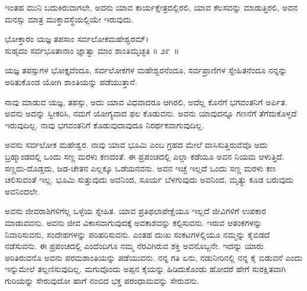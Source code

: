 ಇಂತಹ ಮುನಿ ಬದುಕಿರುವಾಗಲೇ, ಅವನು ಯಾವ ಕಾರ್ಯಕ್ಷೇತ್ರದಲ್ಲಿರಲಿ, ಯಾವ ಕೆಲಸವನ್ನು ಮಾಡುತ್ತಿರಲಿ, ಅವನ ಮನಸ್ಸು ಮಾತ್ರ ಮುಕ್ತಾವಸ್ಥೆಯಲ್ಲಿಯೇ ಇರುವುದು.

\begin{shloka}
ಭೋಕ್ತಾರಂ ಯಜ್ಞ ತಪಸಾಂ ಸರ್ವಲೋಕಮಹೇಶ್ವರಮ್​।\\ಸುಹೃದಂ ಸರ್ವಭೂತಾನಾಂ ಜ್ಞಾತ್ವಾ ಮಾಂ ಶಾಂತಿಮೃಚ್ಛತಿ \hfill॥ ೨೯~॥
\end{shloka}

\begin{artha}
ಯಜ್ಞ ತಪಸ್ಸುಗಳ ಭೋಕ್ತೃವೆಂದೂ, ಸರ್ವಲೋಕಗಳ ಮಹೇಶ್ವರನೆಂದೂ, ಸರ್ವಪ್ರಾಣಿಗಳ ಸ್ನೇಹಿತ\-ನೆಂದೂ ನನ್ನನ್ನು ಅರಿತುಕೊಂಡ ಯೋಗಿ ಶಾಂತಿಯನ್ನು ಪಡೆಯುತ್ತಾನೆ.
\end{artha}

ನಾವು ಮಾಡುವ ಯಜ್ಞ, ತಪಸ್ಸು, ಅದು ಯಾವ ವಿಧವಾದರೂ ಆಗಿರಲಿ, ಅದೆಲ್ಲ ಕೊನೆಗೆ ಭಗವಂತನಿಗೆ ಅರ್ಪಿತ. ಅವನು ಅದನ್ನು ಸ್ವೀಕರಿಸಿ, ನಮಗೆ ಯೋಗ್ಯವಾದ ಫಲ ಕೊಡುವನು. ಅವನು ಯಾವುದನ್ನೂ ಗಣನೆಗೆ ತೆಗೆದುಕೊಳ್ಳದೆ ಇರುವುದಿಲ್ಲ. ನಾವು ಭಗವಂತನಿಗೆ ಕೊಡುವುದಾವುದೂ ನಿರರ್ಥಕವಾಗುವುದಿಲ್ಲ. 

ಅವನು ಸರ್ವಲೋಕ ಮಹೇಶ್ವರ. ನಾವು ಯಾವ ಭೂಮಿ ಎಂಬ ಗ್ರಹದ ಮೇಲೆ ವಾಸಿಸುತ್ತಿರುವೆವೊ ಅದು ಬ್ರಹ್ಮಾಂಡದಲ್ಲಿ ಒಂದು ಸಣ್ಣ ಮರಳು ಕಣದಂತೆ. ಈ ಪ್ರಪಂಚದಲ್ಲಿ ಎಲ್ಲಾ ಕಡೆಯೂ ಅವನ ನಿಯಮ ಆಳುತ್ತಿದೆ. ಸಣ್ಣದು-ದೊಡ್ಡದು, ಜಡ-ಚೇತನ ಎಲ್ಲಕ್ಕೂ ಒಡೆಯನವನು. ಅವನ ಇಚ್ಛೆ ಇಲ್ಲದೆ ಒಂದು ಸಣ್ಣ ಮರಳು ಕಣ ಚಲಿಸುವಂತೆ ಇಲ್ಲ. ಭೂಮಿ ಸುತ್ತುವುದು ಅವನಿಂದ, ಸೂರ್ಯ ಬೆಳಗುವುದು ಅವನಿಂದ, ಮೃತ್ಯು ಕೂಡ ಬರುವುದು ಅವನಿಂದಲೇ.

ಅವನು ಜೀವರಾಶಿಗಳಿಗೆಲ್ಲ ಒಳ್ಳೆಯ ಸ್ನೇಹಿತ. ಯಾವ ಪ್ರತಿಫಲಾಪೇಕ್ಷೆಯೂ ಇಲ್ಲದೆ ಜೀವಿಗಳಿಗೆ ಉಪಕಾರ ಮಾಡುವವನು. ಅವನು ಜೀವ ವಿಕಾಸವಾಗುವುದಕ್ಕೆ ಅವಕಾಶವನ್ನು ಕಲ್ಪಿಸುವನು. ಇರುವ ಆತಂಕಗಳನ್ನು ನಿವಾರಿಸುವನು, ಸಂದೇಹಗಳನ್ನು ಪರಿಹರಿಸುವನು. ಎಂತಹ ದುಃಖ ಸಂಕಟಗಳಲ್ಲಿಯೂ ನಮ್ಮನ್ನು ಕೈಬಿಡದೆ ನಡೆಸುವನು. ಈ ಪ್ರಪಂಚದಲ್ಲಿ ಎಂದೆಂದಿಗೂ ನಮ್ಮ ನೆರವಿಗಿರುವ ಶಕ್ತಿ ಅವನೊಬ್ಬನೇ. ಇದನ್ನು ಯಾರು ಅರಿತಿರುವನೊ ಅವನು ಪರಮಶಾಂತಿಯನ್ನು ಪಡೆಯುವನು. ನನ್ನ ಗತಿ ಏನು, ನಡುನೀರಿನಲ್ಲಿ ನನ್ನ ಕೈ ಬಿಡುವನೆ ಎಂದು ಇನ್ನುಮೇಲೆ ತಲ್ಲಣಿಸುವುದಿಲ್ಲ. ಮಗುವೊಂದು ಅಪ್ಪನ ಕೈಯನ್ನು ಹಿಡಿದುಕೊಂಡು ಹೋದರೆ ಹೇಗೆ ಸುರಕ್ಷಿತವಾಗಿ ಗುರಿಯನ್ನು ಸೇರುವುದೋ ಹಾಗೆ ನಂಬಿದ ಭಕ್ತ ಪರಂಧಾಮವನ್ನು ಸೇರುವನು.

